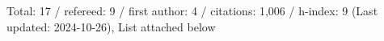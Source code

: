 Total: 17 / refereed: 9 / first author: 4 / citations: 1,006 / h-index: 9 (Last updated: 2024-10-26), List attached below